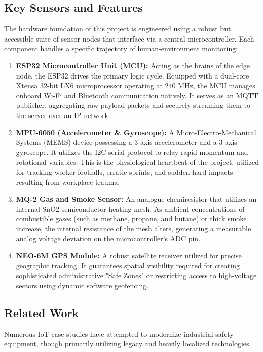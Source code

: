 \documentclass[11pt, conference, a4paper]{IEEEtran}
\begin{document}
\subsection{Key Sensors and Features}
The hardware foundation of this project is engineered using a robust but accessible suite of sensor nodes that interface via a central microcontroller. Each component handles a specific trajectory of human-environment monitoring:
\begin{enumerate}
    \item \textbf{ESP32 Microcontroller Unit (MCU):} Acting as the brains of the edge node, the ESP32 drives the primary logic cycle. Equipped with a dual-core Xtensa 32-bit LX6 microprocessor operating at 240 MHz, the MCU manages onboard Wi-Fi and Bluetooth communication natively. It serves as an MQTT publisher, aggregating raw payload packets and securely streaming them to the server over an IP network.
    \item \textbf{MPU-6050 (Accelerometer \& Gyroscope):} A Micro-Electro-Mechanical Systems (MEMS) device possessing a 3-axis accelerometer and a 3-axis gyroscope. It utilizes the I2C serial protocol to relay rapid momentum and rotational variables. This is the physiological heartbeat of the project, utilized for tracking worker footfalls, erratic sprints, and sudden hard impacts resulting from workplace trauma.
    \item \textbf{MQ-2 Gas and Smoke Sensor:} An analogue chemiresistor that utilizes an internal SnO2 semiconductor heating mesh. As ambient concentrations of combustible gases (such as methane, propane, and butane) or thick smoke increase, the internal resistance of the mesh alters, generating a measurable analog voltage deviation on the microcontroller's ADC pin.
    \item \textbf{NEO-6M GPS Module:} A robust satellite receiver utilized for precise geographic tracking. It guarantees spatial visibility required for creating sophisticated administrative "Safe Zones" or restricting access to high-voltage sectors using dynamic software geofencing.
\end{enumerate}

\subsection{Related Work}
Numerous IoT case studies have attempted to modernize industrial safety equipment, though primarily utilizing legacy and heavily localized technologies.
\end{document}
